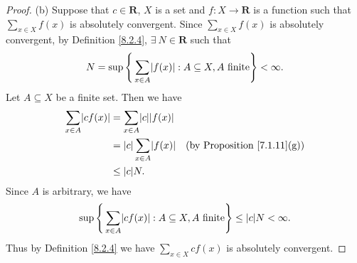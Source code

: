 \begin{proof}{(b)}
    Suppose that \(c \in \mathbf{R}\), \(X\) is a set and \(f : X \to \mathbf{R}\) is a function such that \(\sum_{x \in X} f(x)\) is absolutely convergent.
    Since \(\sum_{x \in X} f(x)\) is absolutely convergent, by Definition \ref{8.2.4}, \(\exists\ N \in \mathbf{R}\) such that
    \[
        N = \sup\Bigg\{\sum_{x \in A} \abs*{f(x)} : A \subseteq X, A \text{ finite}\Bigg\} < \infty.
    \]
    Let \(A \subseteq X\) be a finite set.
    Then we have
    \begin{align*}
        \sum_{x \in A} \abs*{cf(x)} & = \sum_{x \in A} \abs*{c}\abs*{f(x)}                                           \\
                                    & = \abs*{c}\sum_{x \in A} \abs*{f(x)} & \text{(by Proposition \ref{7.1.11}(g))} \\
                                    & \leq \abs*{c} N.
    \end{align*}
    Since \(A\) is arbitrary, we have
    \[
        \sup\Bigg\{\sum_{x \in A} \abs*{cf(x)} : A \subseteq X, A \text{ finite}\Bigg\} \leq \abs*{c}N < \infty.
    \]
    Thus by Definition \ref{8.2.4} we have \(\sum_{x \in X} cf(x)\) is absolutely convergent.


\end{proof}
